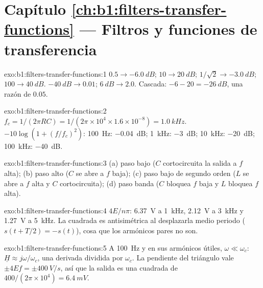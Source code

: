 \section*{Capítulo \ref{ch:b1:filters-transfer-functions} --- Filtros y funciones de transferencia}

\begin{solution}{exo:b1:filters-transfer-functions:1}
$0.5 \to \qty{-6.0}{dB}$; $10 \to \qty{20}{dB}$; $1/\sqrt2 \to \qty{-3.0}{dB}$;
$100 \to \qty{40}{dB}$. $\qty{-40}{dB} \to 0.01$; $\qty{+6}{dB} \to 2.0$.
Cascada: $-6 - 20 = \qty{-26}{dB}$, una razón de $0.05$.
\end{solution}

\begin{solution}{exo:b1:filters-transfer-functions:2}
$f_c = 1/(2\pi RC) = 1/(2\pi \times 10^4 \times 1.6\times10^{-8}) =
\qty{1.0}{kHz}$.  $-10\log(1 + (f/f_c)^2)$: \qty{100}{Hz}:
\qty{-0.04}{dB}; \qty{1}{kHz}: \qty{-3}{dB}; \qty{10}{kHz}: \qty{-20}{dB};
\qty{100}{kHz}: \qty{-40}{dB}.
\end{solution}

\begin{solution}{exo:b1:filters-transfer-functions:3}
(a) paso bajo ($C$ cortocircuita la salida a $f$ alta); (b) paso alto ($C$
se abre a $f$ baja); (c) paso bajo de segundo orden ($L$ se abre a $f$
alta y $C$ cortocircuita); (d) paso banda ($C$ bloquea $f$ baja y $L$
bloquea $f$ alta).
\end{solution}

\begin{solution}{exo:b1:filters-transfer-functions:4}
$4E/n\pi$: \qty{6.37}{V} a \qty{1}{kHz}, \qty{2.12}{V} a \qty{3}{kHz} y
\qty{1.27}{V} a \qty{5}{kHz}. La  cuadrada es antisimétrica al
desplazarla medio periodo ($s(t + T/2) = -s(t)$), cosa que los armónicos
pares no son.
\end{solution}

\begin{solution}{exo:b1:filters-transfer-functions:5}
A \qty{100}{Hz} y en sus armónicos útiles, $\omega \ll \omega_c$:
$\underline H \approx j\omega/\omega_c$, una derivada dividida por
$\omega_c$. La pendiente del triángulo vale $\pm 4Ef = \pm\qty{400}{V/s}$,
así que la salida es una  cuadrada de  $400/(2\pi \times 10^4) =
\qty{6.4}{mV}$.
\end{solution}

